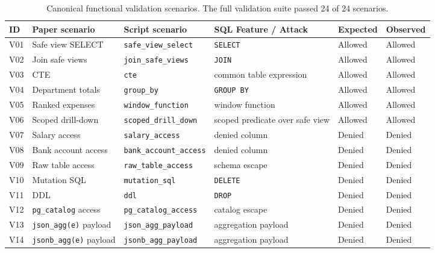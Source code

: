 \documentclass[journal]{IEEEtran}
\begin{document}
\begin{table}[!t]
\centering
\scriptsize
\setlength{\tabcolsep}{3pt}
\caption{Canonical functional validation scenarios. The full validation suite passed 24 of 24 scenarios.}
\label{tab:validation-scenarios}
\begin{tabular}{@{}
  >{\raggedright\arraybackslash}p{}
  >{\raggedright\arraybackslash}p{}
  >{\raggedright\arraybackslash}p{}
  >{\raggedright\arraybackslash}p{}
  >{\raggedright\arraybackslash}p{}
  >{\raggedright\arraybackslash}p{}@{}}
\toprule
ID & Paper scenario & Script scenario & SQL Feature / Attack & Expected & Observed \\
\midrule
V01 & Safe view SELECT & \texttt{safe\_view\_select} & \texttt{SELECT} & Allowed & Allowed \\
V02 & Join safe views & \texttt{join\_safe\_views} & \texttt{JOIN} & Allowed & Allowed \\
V03 & CTE & \texttt{cte} & common table expression & Allowed & Allowed \\
V04 & Department totals & \texttt{group\_by} & \texttt{GROUP\ BY} & Allowed & Allowed \\
V05 & Ranked expenses & \texttt{window\_function} & window function & Allowed & Allowed \\
V06 & Scoped drill-down & \texttt{scoped\_drill\_down} & scoped predicate over safe view & Allowed & Allowed \\
V07 & Salary access & \texttt{salary\_access} & denied column & Denied & Denied \\
V08 & Bank account access & \texttt{bank\_account\_access} & denied column & Denied & Denied \\
V09 & Raw table access & \texttt{raw\_table\_access} & schema escape & Denied & Denied \\
V10 & Mutation SQL & \texttt{mutation\_sql} & \texttt{DELETE} & Denied & Denied \\
V11 & DDL & \texttt{ddl} & \texttt{DROP} & Denied & Denied \\
V12 & \texttt{pg\_catalog} access & \texttt{pg\_catalog\_access} & catalog escape & Denied & Denied \\
V13 & \texttt{json\_agg(e)} payload & \texttt{json\_agg\_payload} & aggregation payload & Denied & Denied \\
V14 & \texttt{jsonb\_agg(e)} payload & \texttt{jsonb\_agg\_payload} & aggregation payload & Denied & Denied \\

\end{tabular}
\end{table}
\end{document}
